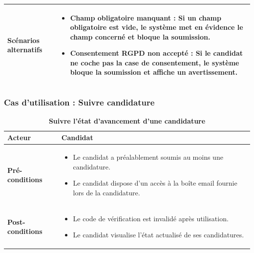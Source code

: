 \documentclass[12pt,a4paper,oneside]{report}
\begin{document}
\begin{itemize}
\begin{xltabular}{\textwidth}{|l|X|}
    \textbf{Scénarios alternatifs} & 
    \begin{itemize}[leftmargin=*, nosep]
        \item \textbf{ Champ obligatoire manquant} : Si un champ obligatoire est vide, le système met en évidence le champ concerné et bloque la soumission.
        \item \textbf{Consentement RGPD non accepté} : Si le candidat ne coche pas la case de consentement, le système bloque la soumission et affiche un avertissement.
    \end{itemize} \\ \hline
    
\end{xltabular}

\subsubsection{Cas d'utilisation : Suivre candidature}
\renewcommand{\arraystretch}{1.5}

\begin{xltabular}{\textwidth}{|l|X|}
   \caption{\textbf{Suivre l'état d'avancement d'une candidature}}  
    \label{tab:suivi_candidature} \\
    \hline
    \textbf{Acteur} & Candidat \\ \hline
    


    \textbf{Pré-conditions} & 
    \begin{itemize}[leftmargin=*, nosep]
        \item Le candidat a préalablement soumis au moins une candidature.
        \item Le candidat dispose d'un accès à la boîte email fournie lors de la candidature.
    \end{itemize} \\ \hline

    \textbf{Post-conditions} & 
    \begin{itemize}[leftmargin=*, nosep]
        \item Le code de vérification est invalidé après utilisation.
        \item Le candidat visualise l'état actualisé de ses candidatures.
    \end{itemize} \\ \hline


\end{xltabular}
\end{itemize}
\end{document}
